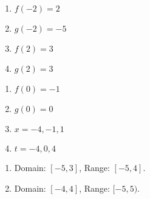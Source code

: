 \documentclass{ximera}
\begin{document}
\begin{enumerate}


\item  $f(-2) = 2$

\item $g(-2) = -5$

\item $f(2) = 3$

\item  $g(2) = 3$



\end{enumerate}




\begin{enumerate}


\item $f(0) = -1$

\item $g(0) = 0$

\item  $x  = -4, -1, 1$

\item  $t = -4, 0, 4$


\end{enumerate}




\begin{enumerate}


\item  Domain:  $[-5,3]$,  Range:  $[-5,4]$.

\item  Domain:  $[-4,4]$,  Range:  $[-5,5)$.


\end{enumerate}
\end{document}
